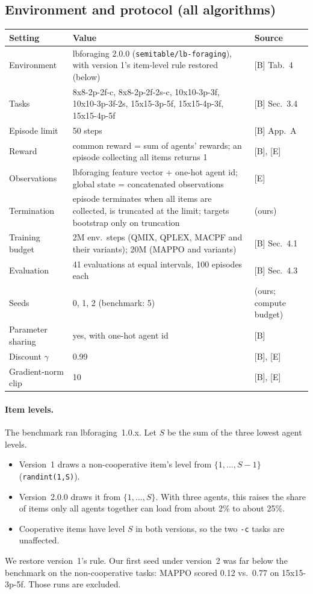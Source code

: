 \subsection{Environment and protocol (all algorithms)}

\begin{table}[H]
\centering\small
\begin{tabularx}{\textwidth}{l X l}
\toprule
Setting & Value & Source \\
\midrule
Environment & lbforaging 2.0.0 (\texttt{semitable/lb-foraging}), with version 1's item-level rule restored (below) & [B] Tab.~4 \\
Tasks & 8x8-2p-2f-c, 8x8-2p-2f-2s-c, 10x10-3p-3f, 10x10-3p-3f-2s, 15x15-3p-5f, 15x15-4p-3f, 15x15-4p-5f & [B] Sec.~3.4 \\
Episode limit & 50 steps & [B] App.~A \\
Reward & common reward = sum of agents' rewards; an episode collecting all items returns 1 & [B], [E] \\
Observations & lbforaging feature vector + one-hot agent id; global state = concatenated observations & [E] \\
Termination & episode terminates when all items are collected, is truncated at the limit; targets bootstrap only on truncation & (ours) \\
Training budget & 2M env.\ steps (QMIX, QPLEX, MACPF and their variants); 20M (MAPPO and variants) & [B] Sec.~4.1 \\
Evaluation & 41 evaluations at equal intervals, 100 episodes each & [B] Sec.~4.3 \\
Seeds & 0, 1, 2 (benchmark: 5) & (ours; compute budget) \\
Parameter sharing & yes, with one-hot agent id & [B] \\
Discount $\gamma$ & 0.99 & [B], [E] \\
Gradient-norm clip & 10 & [B], [E] \\
\bottomrule
\end{tabularx}
\end{table}

\paragraph{Item levels.} The benchmark ran lbforaging~1.0.x. Let $S$ be the sum of the three
lowest agent levels.
\begin{itemize}
  \item Version~1 draws a non-cooperative item's level from $\{1,\dots,S-1\}$
        (\texttt{randint(1,S)}).
  \item Version~2.0.0 draws it from $\{1,\dots,S\}$. With three agents, this raises the share of
        items only all agents together can load from about 2\% to about 25\%.
  \item Cooperative items have level $S$ in both versions, so the two \texttt{-c} tasks are
        unaffected.
\end{itemize}
We restore version~1's rule. Our first seed under version~2 was far below the benchmark on the
non-cooperative tasks: MAPPO scored 0.12 vs.\ 0.77 on 15x15-3p-5f. Those runs are excluded.

